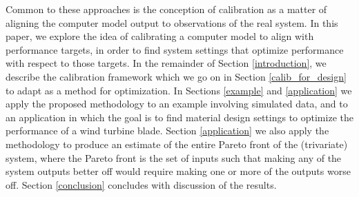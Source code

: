 \documentclass{article}
\begin{document}
%

Common to these approaches is the conception of calibration as a matter of aligning the computer model output to observations of the real system. 
%
In this paper, we explore the idea of calibrating a computer model to align with performance targets, in order to find system settings that optimize performance with respect to those targets.
%
In the remainder of Section \ref{introduction}, we describe the calibration framework which we go on in Section \ref{calib_for_design} to adapt as a method for optimization. 
%
In Sections \ref{example} and \ref{application} we apply the proposed methodology to an example involving simulated data, and to an application in which the goal is to find material design settings to optimize the performance of a wind turbine blade.
%
Section \ref{application} we also apply the methodology to produce an estimate of the entire Pareto front of the (trivariate) system, where the Pareto front is the set of inputs such that making any of the system outputs better off would require making one or more of the outputs worse off. 
%
Section \ref{conclusion} concludes with discussion of the results.
\end{document}
